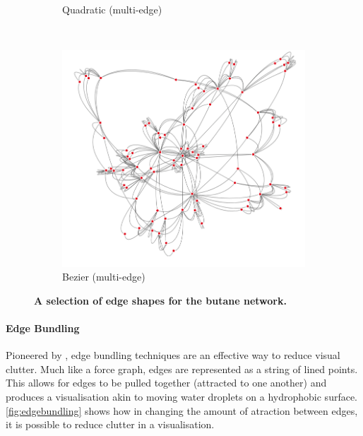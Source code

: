 \begin{figure}[H]
\begin{subfigure}[b]{.32\textheight}
     \caption{Quadratic (multi-edge)}
     \end{subfigure}\\
     \begin{subfigure}[b]{.32\textheight}
         \centering
     \includegraphics[width=\textwidth]{figures_c1/edgetype/multibeziergray.png}
     \caption{Bezier (multi-edge)}
     \end{subfigure}
        \caption{\textbf{A selection of edge shapes for the butane network.}       }
      \label{fig:curvededge}
\end{figure}








\paragraph{Edge Bundling }
Pioneered by \cite{bundlepioneer}, edge bundling techniques are an effective way to reduce visual clutter. Much like a force graph, edges are represented as a string of lined points. This allows for edges to be pulled together (attracted to one another) and produces a visualisation akin to moving water droplets on a hydrophobic surface. \autoref{fig:edgebundling} shows how in changing the amount of atraction between edges, it is possible to reduce clutter in a visualisation. 


